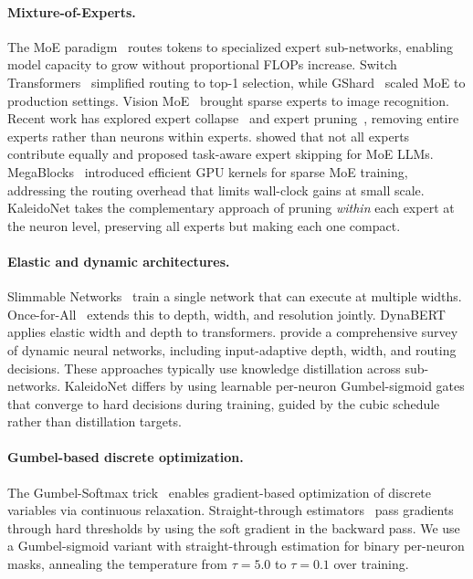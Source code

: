 \paragraph{Mixture-of-Experts.}
The MoE paradigm~\citep{shazeer2017outrageously} routes tokens to specialized expert sub-networks, enabling model capacity to grow without proportional FLOPs increase. Switch Transformers~\citep{fedus2022switch} simplified routing to top-1 selection, while GShard~\citep{lepikhin2021gshard} scaled MoE to production settings. Vision MoE~\citep{riquelme2021scaling} brought sparse experts to image recognition. Recent work has explored expert collapse~\citep{chi2022representation} and expert pruning~\citep{kim2023mixture}, removing entire experts rather than neurons within experts. \citet{lu2024expertslimming} showed that not all experts contribute equally and proposed task-aware expert skipping for MoE LLMs. MegaBlocks~\citep{gale2023megablocks} introduced efficient GPU kernels for sparse MoE training, addressing the routing overhead that limits wall-clock gains at small scale. KaleidoNet takes the complementary approach of pruning \emph{within} each expert at the neuron level, preserving all experts but making each one compact.

\paragraph{Elastic and dynamic architectures.}
Slimmable Networks~\citep{yu2019universally} train a single network that can execute at multiple widths. Once-for-All~\citep{cai2020once} extends this to depth, width, and resolution jointly. DynaBERT~\citep{hou2020dynabert} applies elastic width and depth to transformers. \citet{chen2024dynamic} provide a comprehensive survey of dynamic neural networks, including input-adaptive depth, width, and routing decisions. These approaches typically use knowledge distillation across sub-networks. KaleidoNet differs by using learnable per-neuron Gumbel-sigmoid gates that converge to hard decisions during training, guided by the cubic schedule rather than distillation targets.

\paragraph{Gumbel-based discrete optimization.}
The Gumbel-Softmax trick~\citep{jang2017categorical,maddison2017concrete} enables gradient-based optimization of discrete variables via continuous relaxation. Straight-through estimators~\citep{bengio2013estimating,courbariaux2016binarized} pass gradients through hard thresholds by using the soft gradient in the backward pass. We use a Gumbel-sigmoid variant with straight-through estimation for binary per-neuron masks, annealing the temperature from $\tau{=}5.0$ to $\tau{=}0.1$ over training.


